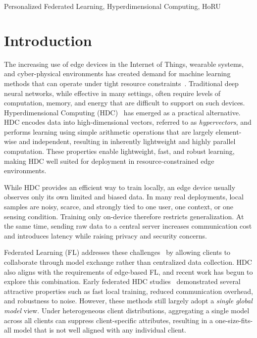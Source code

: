 \documentclass[lettersize,journal]{IEEEtran}
\begin{document}
\begin{IEEEkeywords}
Personalized Federated Learning, Hyperdimensional Computing, HoRU
\end{IEEEkeywords}

\section{Introduction}

The increasing use of edge devices in the Internet of Things, wearable systems, and cyber-physical environments has created demand for machine learning methods that can operate under tight resource constraints~\cite{SINGH202371}.
Traditional deep neural networks, while effective in many settings, often require levels of computation, memory, and energy that are difficult to support on such devices.
Hyperdimensional Computing (HDC)~\cite{10610176,10137134} has emerged as a practical alternative.
HDC encodes data into high-dimensional vectors, referred to as \textit{hypervectors}, and performs learning using simple arithmetic operations that are largely element-wise and independent, resulting in inherently lightweight and highly parallel computation.
These properties enable lightweight, fast, and robust learning, making HDC well suited for deployment in resource-constrained edge environments.

While HDC provides an efficient way to train locally, an edge device usually observes only its own limited and biased data.
In many real deployments, local samples are noisy, scarce, and strongly tied to one user, one context, or one sensing condition.
Training only on-device therefore restricts generalization.
At the same time, sending raw data to a central server increases communication cost and introduces latency while raising privacy and security concerns.

Federated Learning (FL) addresses these challenges~\cite{kairouz2021advancesopenproblemsfederated,mcmahan2023communicationefficientlearningdeepnetworks} by allowing clients to collaborate through model exchange rather than centralized data collection.
HDC also aligns with the requirements of edge-based FL, and recent work has begun to explore this combination.
Early federated HDC studies~\cite{ergun2023federatedhyperdimensionalcomputing,zhao2022fedhd,hyunsei2025fed,flhdc2021hsieh} demonstrated several attractive properties such as fast local training, reduced communication overhead, and robustness to noise.
However, these methods still largely adopt a \emph{single global model} view.
Under heterogeneous client distributions, aggregating a single model across all clients can suppress client-specific attributes, resulting in a one-size-fits-all model that is not well aligned with any individual client.
\end{document}
